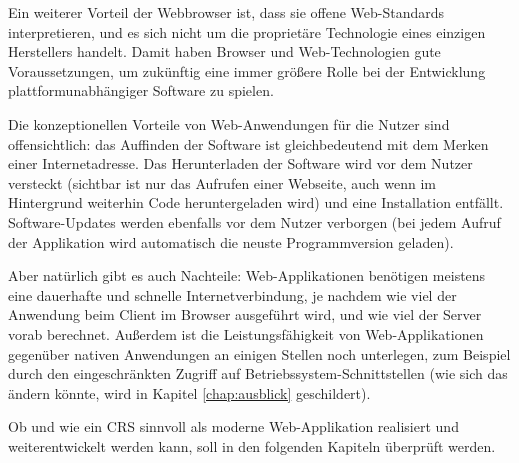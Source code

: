 Ein weiterer Vorteil der Webbrowser ist, dass sie offene Web-Standards interpretieren, und es sich nicht um die proprietäre Technologie eines einzigen Herstellers handelt. Damit haben Browser und Web-Technologien gute Voraussetzungen, um zukünftig eine immer größere Rolle bei der Entwicklung plattformunabhängiger Software zu spielen.

Die konzeptionellen Vorteile von Web-Anwendungen für die Nutzer sind offensichtlich: das Auffinden der Software ist gleichbedeutend mit dem Merken einer Internetadresse. Das Herunterladen der Software wird vor dem Nutzer versteckt (sichtbar ist nur das Aufrufen einer Webseite, auch wenn im Hintergrund weiterhin Code heruntergeladen wird) und eine Installation entfällt. Software-Updates werden ebenfalls vor dem Nutzer verborgen (bei jedem Aufruf der Applikation wird automatisch die neuste Programmversion geladen).

Aber natürlich gibt es auch Nachteile: Web-Applikationen benötigen meistens eine dauerhafte und schnelle Internetverbindung, je nachdem wie viel der Anwendung beim Client im Browser ausgeführt wird, und wie viel der Server vorab berechnet. Außerdem ist die Leistungsfähigkeit von Web-Applikationen gegenüber nativen Anwendungen an einigen Stellen noch unterlegen, zum Beispiel durch den eingeschränkten Zugriff auf Betriebssystem-Schnittstellen (wie sich das ändern könnte, wird in Kapitel \ref{chap:ausblick} geschildert).

Ob und wie ein CRS sinnvoll als moderne Web-Applikation realisiert und weiterentwickelt werden kann, soll in den folgenden Kapiteln überprüft werden.

